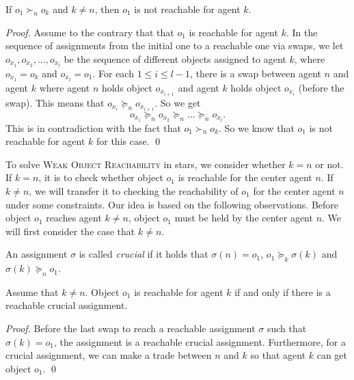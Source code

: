 \begin{lemma}\label{lem_1k}
    If $o_1\succ_n o_k$ and $k\neq n$, then $o_1$ is not reachable for agent $k$.
\end{lemma}
\begin{proof}

    Assume to the contrary that that $o_1$ is reachable for agent $k$. In the sequence of assignments from the initial one to a reachable one via swaps,
    we let $o_{x_1}, o_{x_2},\dots, o_{x_l}$ be the sequence of different objects assigned to agent $k$,
    where $o_{x_1}=o_k$ and $o_{x_l}=o_1$. For each $1\leq i \leq l-1$, there is a swap between agent $n$ and agent $k$ where  agent $n$ holds object $o_{x_{i+1}}$
    and agent $k$ holds object $o_{x_{i}}$ (before the swap). This means that $o_{x_{i}} \succeq_n o_{x_{i+1}}$. So we get
    $$o_{x_1} \succeq_n o_{x_2} \succeq_n\dots \succeq_n o_{x_l}.$$
    This is in contradiction with the fact that $o_1\succ_n o_k$. So we know that $o_1$ is not reachable for agent $k$ for this case.
\qed
\end{proof}



To solve \textsc{Weak Object Reachability} in stars, we consider whether $k=n$ or not. If $k=n$, it is to check whether object $o_1$ is reachable for the center agent $n$. %
If $k\neq n$, we will transfer it to checking the reachability of $o_1$ for the center agent $n$ under some constraints. Our idea is based on the following observations. Before object $o_1$ reaches agent $k\neq n$, object $o_1$ must be held by the center agent $n$. We will first consider the case that $k\neq n$.

\begin{definition}
An assignment $\sigma$ is called \emph{crucial} if it holds that $\sigma(n)=o_1$, $o_1\succeq_k \sigma(k)$ and $\sigma(k)\succeq_n o_1$.
\end{definition}
\begin{ob}\label{ob-equel}
Assume that $k\neq n$.
Object $o_1$ is reachable for agent $k$ if and only if there is a reachable crucial assignment.
\end{ob}
\begin{proof}
Before the last swap to reach a reachable assignment $\sigma$ such that $\sigma(k)=o_1$, the assignment is a reachable crucial assignment.
Furthermore, for a crucial assignment, we can make a trade between $n$ and $k$ so that agent $k$ can get object $o_1$.
\qed
\end{proof}

